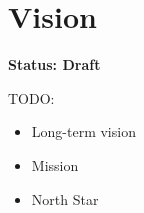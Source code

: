 \section{Vision}
\textbf{Status: Draft}

TODO:
\begin{itemize}
\item Long-term vision
\item Mission
\item North Star
\end{itemize}
